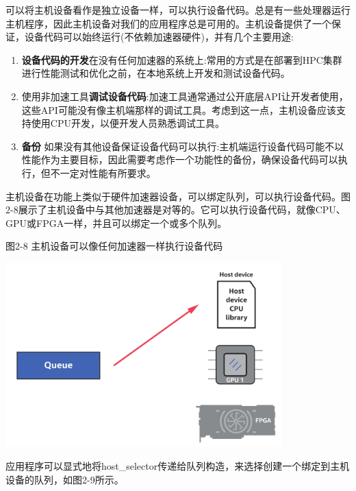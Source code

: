 可以将主机设备看作是独立设备一样，可以执行设备代码。总是有一些处理器运行主机程序，因此主机设备对我们的应用程序总是可用的。主机设备提供了一个保证，设备代码可以始终运行(不依赖加速器硬件)，并有几个主要用途:\par

\begin{enumerate}
	\item \textbf{设备代码的开发}在没有任何加速器的系统上:常用的方式是在部署到HPC集群进行性能测试和优化之前，在本地系统上开发和测试设备代码。
	\item 使用非加速工具\textbf{调试设备代码}:加速工具通常通过公开底层API让开发者使用，这些API可能没有像主机端那样的调试工具。考虑到这一点，主机设备应该支持使用CPU开发，以便开发人员熟悉调试工具。
	\item \textbf{备份} 如果没有其他设备保证设备代码可以执行:主机端运行设备代码可能不以性能作为主要目标，因此需要考虑作一个功能性的备份，确保设备代码可以执行，但不一定对性能有所要求。
\end{enumerate}

主机设备在功能上类似于硬件加速器设备，可以绑定队列，可以执行设备代码。图2-8展示了主机设备中与其他加速器是对等的。它可以执行设备代码，就像CPU、GPU或FPGA一样，并且可以绑定一个或多个队列。\par

\hspace*{\fill} \par %
图2-8 主机设备可以像任何加速器一样执行设备代码
\begin{center}
	\includegraphics[width=0.8\textwidth]{content/chapter-2/images/6}
\end{center}

应用程序可以显式地将host\_selector传递给队列构造，来选择创建一个绑定到主机设备的队列，如图2-9所示。\par

